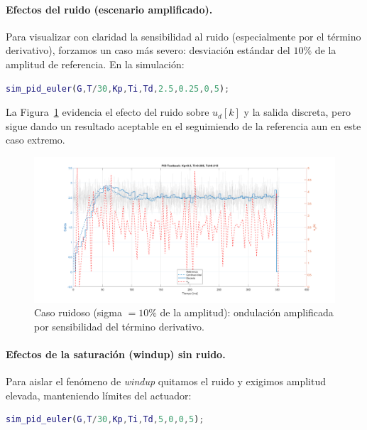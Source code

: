 \paragraph{Efectos del ruido (escenario amplificado).}
Para visualizar con claridad la sensibilidad al ruido (especialmente por el término derivativo), forzamos un caso más severo: desviación estándar del \(10\%\) de la amplitud de referencia. En la simulación:


\begin{lstlisting}[language=Matlab,breaklines=true,basicstyle=\ttfamily\footnotesize]
	sim_pid_euler(G,T/30,Kp,Ti,Td,2.5,0.25,0,5);
\end{lstlisting}

La Figura~\ref{fig:ruido_10pct} evidencia el efecto del ruido sobre \(u_d[k]\) y la salida discreta, pero sigue dando un resultado aceptable en el seguimiendo de la referencia aun en este caso extremo.

\begin{figure}[!t]
	\centering
	\includegraphics[width=\columnwidth]{img/ruido_10pct.png}%
	\caption{Caso ruidoso (sigma $=10\%$ de la amplitud): ondulación amplificada por sensibilidad del término derivativo.}
	\label{fig:ruido_10pct}
\end{figure}

\paragraph{Efectos de la saturación (windup) sin ruido.}
Para aislar el fenómeno de \emph{windup} quitamos el ruido y exigimos amplitud elevada, manteniendo límites del actuador:
\begin{lstlisting}[language=Matlab,breaklines=true,basicstyle=\ttfamily\footnotesize]
	sim_pid_euler(G,T/30,Kp,Ti,Td,5,0,0,5);
\end{lstlisting}


